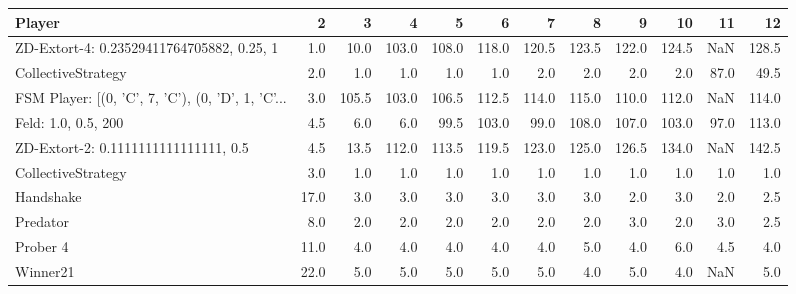 \begin{tabular}{lrrrrrrrrrrr}
\toprule
                                            Player &     2 &      3 &      4 &      5 &      6 &      7 &      8 &      9 &     10 &    11 &     12 \\
\midrule
         ZD-Extort-4: 0.23529411764705882, 0.25, 1 &   1.0 &   10.0 &  103.0 &  108.0 &  118.0 &  120.5 &  123.5 &  122.0 &  124.5 &   NaN &  128.5 \\
                                CollectiveStrategy &   2.0 &    1.0 &    1.0 &    1.0 &    1.0 &    2.0 &    2.0 &    2.0 &    2.0 &  87.0 &   49.5 \\
 FSM Player: [(0, 'C', 7, 'C'), (0, 'D', 1, 'C'... &   3.0 &  105.5 &  103.0 &  106.5 &  112.5 &  114.0 &  115.0 &  110.0 &  112.0 &   NaN &  114.0 \\
                               Feld: 1.0, 0.5, 200 &   4.5 &    6.0 &    6.0 &   99.5 &  103.0 &   99.0 &  108.0 &  107.0 &  103.0 &  97.0 &  113.0 \\
              ZD-Extort-2: 0.1111111111111111, 0.5 &   4.5 &   13.5 &  112.0 &  113.5 &  119.5 &  123.0 &  125.0 &  126.5 &  134.0 &   NaN &  142.5 \\
                                CollectiveStrategy &   3.0 &    1.0 &    1.0 &    1.0 &    1.0 &    1.0 &    1.0 &    1.0 &    1.0 &   1.0 &    1.0 \\
                                         Handshake &  17.0 &    3.0 &    3.0 &    3.0 &    3.0 &    3.0 &    3.0 &    2.0 &    3.0 &   2.0 &    2.5 \\
                                          Predator &   8.0 &    2.0 &    2.0 &    2.0 &    2.0 &    2.0 &    2.0 &    3.0 &    2.0 &   3.0 &    2.5 \\
                                          Prober 4 &  11.0 &    4.0 &    4.0 &    4.0 &    4.0 &    4.0 &    5.0 &    4.0 &    6.0 &   4.5 &    4.0 \\
                                          Winner21 &  22.0 &    5.0 &    5.0 &    5.0 &    5.0 &    5.0 &    4.0 &    5.0 &    4.0 &   NaN &    5.0 \\
\bottomrule
\end{tabular}
